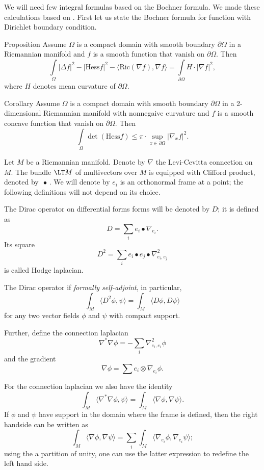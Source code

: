 We will need few integral formulas based on the Bochner formula.
We made these calculations based on \cite[Chapter II]{lawson-michelsohn}.
First let us state the Bochner formula for function with Dirichlet boundary condition.

\begin{thm}{Proposition}\label{prop:bochner-dirichle-old}
Assume $\Omega$ is a compact domain with smooth boundary $\partial \Omega$ in a Riemannian manifold
and $f$ is a smooth function that vanish on $\partial \Omega$.
Then
\[\int\limits_\Omega |\Delta f|^2
-|\mathrm{Hess}f|^2
-\langle\mathrm{Ric}(\nabla f),\nabla f\rangle
=\int\limits_{\partial\Omega}
H\cdot|\nabla f|^2,\]
where $H$ denotes mean curvature of $\partial \Omega$.
\end{thm}
 
\begin{thm}{Corollary}
Assume $\Omega$ is a compact domain with smooth boundary $\partial \Omega$ in a 2-dimensional Riemannian manifold with nonnegaive curvature
and $f$ is a smooth concave function that vanish on $\partial \Omega$.
Then
\[\int\limits_\Omega 
\det(\mathrm{Hess}f)
\le\pi\cdot\sup_{x\in\partial\Omega}|\nabla_x f|^2.\]

\end{thm}






Let $M$ be a Riemannian manifold.
Denote by $\nabla$ the Levi-Cevitta connection on $M$.
The bundle $\LT M$ of multivectors over $M$ is equipped with Clifford product, denoted by $\,\bullet \,$.
We will denote by $e_i$ is an orthonormal frame at a point; the following definitions will not depend on its choice.

The Dirac operator on differential forms forms will be denoted by $D$;
it is defined as
\[D=\sum_i e_i\bullet \nabla_{e_i}.\]
Its square 
\[D^2=\sum_i e_i\bullet e_j\bullet \nabla^2_{e_i,e_j}\]
is called Hodge laplacian.

The Dirac operator if \emph{formally self-adjoint}, in particular,
\[\int_M \langle D^2\phi,\psi\rangle=\int_M \langle D\phi,D\psi\rangle\]
for any two vector fields $\phi$ and $\psi$ with compact support.

Further, define the connection laplacian
\[\nabla^*\nabla\phi =-\sum_i\nabla^2_{e_i,e_i}\phi\]
and the gradient
\[\nabla \phi=\sum e_i\otimes \nabla_{e_i}\phi.\]

For the connection laplacian we also have the identity
\[\int_M \langle \nabla^*\nabla\phi,\psi\rangle
=
\int_M \langle \nabla\phi,\nabla\psi\rangle.\]
If $\phi$ and $\psi$ have support in the domain where the frame is defined, then the right handside can be written as 
\[\int_M \langle \nabla\phi,\nabla\psi\rangle=\sum_i\int_M\langle \nabla_{e_i}\phi,\nabla_{e_i}\psi\rangle;\]
using the a partition of unity, one can use the latter expression to redefine the left hand side. 

